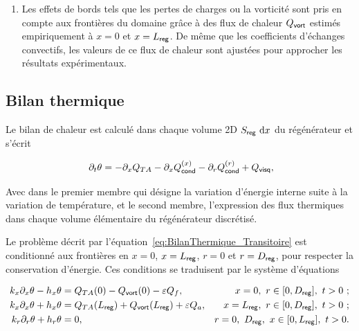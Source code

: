 \begin{enumerate}[label=\textbf{(\roman*)}]
\item Les effets de bords tels que les pertes de charges ou la vorticité sont pris en compte aux frontières du domaine grâce à des flux de chaleur $Q_{\sf vort}$ estimés empiriquement à $x=0$ et $x=L_{\sf reg}$. De même que les coefficients d'échanges convectifs, les valeurs de ce flux de chaleur sont ajustées pour approcher les résultats expérimentaux.

\end{enumerate}

\subsection{Bilan thermique}

Le bilan de chaleur est calculé dans chaque volume 2D $S_{\sf reg}\ \mathrm{d} x$ du régénérateur et s'écrit 


\begin{equation}
[\Phi\rho_0 C_p + (1-\Phi)\rho_s C_s]\ \partial_t \theta = - \partial_x Q_{TA} - \partial_x Q_{\sf cond}^{(x)} - \partial_r Q_{\sf cond}^{(r)} + Q_{\sf visq},
\label{eq:BilanThermique_Transitoire}
\end{equation}

Avec dans le premier membre qui désigne la variation d'énergie interne suite à la variation de température, et le second membre, l'expression des flux thermiques dans chaque volume élémentaire du régénérateur discrétisé.\smallskip

Le problème décrit par l'équation~\ref{eq:BilanThermique_Transitoire} est conditionné aux frontières en $x=0$, $x=L_{\sf reg}$,  $r=0$ et $r=D_{\sf reg}$, pour respecter la conservation d'énergie. Ces conditions se traduisent par le système d'équations

\begin{subequations}
	\begin{align}
		k_x \partial_x \theta - h_x\theta &= Q_{TA}(0) - Q_{\sf vort}(0) - \epsilon Q_f, & x=0,\ r \in [0,D_{\sf reg}],\ t>0\ ; \label{eq:CondFront_x_0Froid}\\%
		k_x \partial_x \theta + h_x \theta &= Q_{TA}(L_{\sf reg}) + Q_{\sf vort}(L_{\sf reg}) + \epsilon Q_a, & x=L_{\sf reg},\ r \in [0,D_{\sf reg}],\ t>0\ ; \label{eq:CondFront_x_LregAmb}\\%
		k_r \partial_r \theta + h_r \theta &= 0, & r=0,\ D_{\sf reg},\ x \in [0,L_{\sf reg}],\ t>0. \label{eq:CondFront_r_Rreg}
	\end{align}%
	\label{eq:CondFront}%
\end{subequations}

